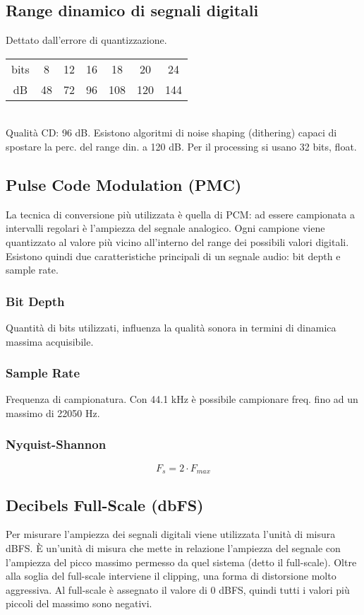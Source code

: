 \documentclass[8pt,a4paper]{article}
\begin{document}
\begin{multicols}{5}
    \subsection{Range dinamico di segnali digitali}
    Dettato dall'errore di quantizzazione. 
    \begin{tabular}{ccccccc}
      bits & 8 & 12 & 16 & 18 & 20 & 24 \\
      dB & 48 & 72 & 96 & 108 & 120 & 144 
    \end{tabular} \\
    Qualità CD: 96 dB. Esistono algoritmi di noise shaping (dithering) capaci di
    spostare la perc. del range din. a 120 dB.
    Per il processing si usano 32 bits, float.

    \subsection{Pulse Code Modulation (PMC)}
    La tecnica di conversione più utilizzata è quella di PCM: ad essere campionata 
    a intervalli regolari è l’ampiezza del segnale analogico. Ogni campione viene 
    quantizzato al valore più vicino all’interno del range dei possibili valori 
    digitali. \\
    Esistono quindi due caratteristiche principali di un segnale audio: bit depth e
    sample rate.

    \subsubsection{Bit Depth}
    Quantità di bits utilizzati, influenza la qualità sonora in termini di dinamica
    massima acquisibile.

    \subsubsection{Sample Rate}
    Frequenza di campionatura. Con 44.1 kHz è possibile campionare freq. fino ad un
    massimo di 22050 Hz.

    \subsubsection{Nyquist-Shannon}
    \begin{equation*}
      F_s = 2 \cdot F_{max}
    \end{equation*}
    

    \subsection{Decibels Full-Scale (dbFS)}
    Per misurare l’ampiezza dei segnali digitali viene utilizzata l’unità di misura
    dBFS. È un’unità di misura che mette in relazione l'ampiezza del segnale con 
    l’ampiezza del picco massimo permesso da quel sistema (detto il full-scale). Oltre 
    alla soglia del full-scale interviene il clipping, una forma di distorsione molto 
    aggressiva. Al full-scale è assegnato il valore di 0 dBFS, quindi tutti i valori 
    più piccoli del massimo sono negativi.


\end{multicols}
\end{document}
